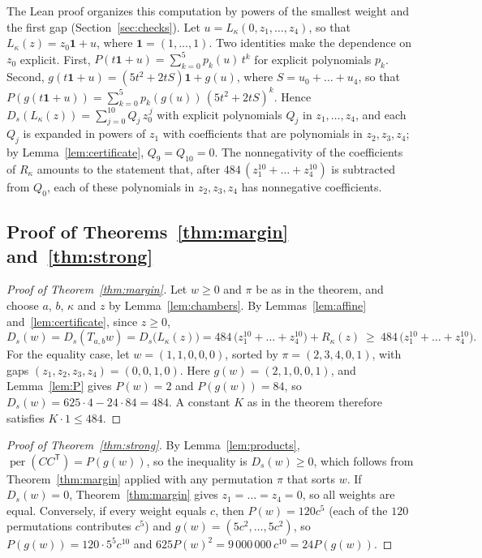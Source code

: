\documentclass[11pt,a4paper]{article}
\theoremstyle{definition}
\theoremstyle{remark}
\newcommand{\per}{\operatorname{per}}
\newcommand{\T}{\mathsf{T}}
\begin{document}
The Lean proof organizes this computation by powers of the smallest weight and the first gap (Section~\ref{sec:checks}). Let $u=L_\kappa(0,z_1,\dots,z_4)$, so that
$L_\kappa(z)=z_0\mathbf 1+u$, where $\mathbf 1=(1,\dots,1)$. Two identities make the dependence on $z_0$
explicit. First, $P(t\mathbf1+u)=\sum_{k=0}^5p_k(u)\,t^k$ for explicit polynomials $p_k$. Second,
$g(t\mathbf1+u)=(5t^2+2tS)\mathbf1+g(u)$, where $S=u_0+\dots+u_4$, so that
$P(g(t\mathbf1+u))=\sum_{k=0}^5p_k(g(u))\,(5t^2+2tS)^k$. Hence $D_s(L_\kappa(z))=\sum_{j=0}^{10}Q_j\,z_0^{\,j}$ with
explicit polynomials $Q_j$ in $z_1,\dots,z_4$, and each $Q_j$ is expanded in powers of $z_1$ with coefficients that are
polynomials in $z_2,z_3,z_4$; by Lemma~\ref{lem:certificate}, $Q_9=Q_{10}=0$. The nonnegativity of the coefficients of
$R_\kappa$ amounts to the statement that, after $484\,(z_1^{10}+\dots+z_4^{10})$ is subtracted from $Q_0$, each of
these polynomials in $z_2,z_3,z_4$ has nonnegative coefficients.

\subsection{Proof of Theorems~\ref{thm:margin} and~\ref{thm:strong}}

\begin{proof}[Proof of Theorem~\ref{thm:margin}]
Let $w\ge0$ and $\pi$ be as in the theorem, and choose $a$, $b$, $\kappa$ and $z$ by Lemma~\ref{lem:chambers}. By
Lemmas~\ref{lem:affine} and~\ref{lem:certificate}, since $z\ge0$,
\[
D_s(w)=D_s(T_{a,b}w)=D_s\bigl(L_\kappa(z)\bigr)=484\,\bigl(z_1^{10}+\dots+z_4^{10}\bigr)+R_\kappa(z)
\ \ge\ 484\,\bigl(z_1^{10}+\dots+z_4^{10}\bigr).
\]
For the equality case, let $w=(1,1,0,0,0)$, sorted by $\pi=(2,3,4,0,1)$, with gaps $(z_1,z_2,z_3,z_4)=(0,0,1,0)$. Here
$g(w)=(2,1,0,0,1)$, and Lemma~\ref{lem:P} gives $P(w)=2$ and $P(g(w))=84$, so $D_s(w)=625\cdot4-24\cdot84=484$. A
constant $K$ as in the theorem therefore satisfies $K\cdot1\le484$.
\end{proof}

\begin{proof}[Proof of Theorem~\ref{thm:strong}]
By Lemma~\ref{lem:products}, $\per(CC^\T)=P(g(w))$, so the inequality is $D_s(w)\ge0$, which follows from
Theorem~\ref{thm:margin} applied with any permutation $\pi$ that sorts $w$. If $D_s(w)=0$, Theorem~\ref{thm:margin}
gives $z_1=\dots=z_4=0$, so all weights are equal. Conversely, if every weight equals $c$, then $P(w)=120c^5$ (each of
the $120$ permutations contributes $c^5$) and $g(w)=(5c^2,\dots,5c^2)$, so $P(g(w))=120\cdot5^5c^{10}$ and
$625P(w)^2=9\,000\,000\,c^{10}=24P(g(w))$.
\end{proof}
\end{document}
